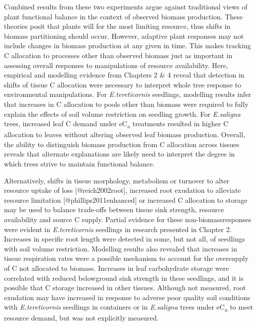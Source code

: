\documentclass[a4paper]{article}
\begin{document}
Combined results from these two experiments argue against traditional views of plant functional balance in the context of observed biomass production. These theories posit that plants will  for the most limiting resource, thus shifts in biomass partitioning should occur. However, adaptive plant responses may not include changes in biomass production at any given  in time.  This makes tracking C allocation to processes other than observed biomass just as important in assessing overall responses to manipulations of resource availability. Here, empirical and modelling evidence from Chapters 2 \& 4 reveal that detection in shifts of tissue C allocation were necessary to interpret whole tree response to environmental manipulations. For \textit{E.tereticornis} seedlings, modelling results infer that increases in C allocation to pools other than biomass were required to fully explain the effects of soil volume restriction on seedling growth. For \textit{E.saligna} trees, increased leaf C demand under eC\textsubscript{a} treatments resulted in higher C allocation to leaves without altering observed leaf biomass production. Overall, the ability to distinguish biomass production from C allocation across tissues reveals that alternate explanations are likely need to interpret the degree in which trees strive to maintain functional balance.

Alternatively, shifts in tissue morphology, metabolism or turnover to alter resource uptake of loss [@reich2002root], increased root exudation to alleviate resource limitation [@phillips2011enhanced] or increased C allocation to storage \citep{sala2012carbon, dietze2014nonstructural} may be used to balance trade-offs between tissue sink strength, resource availability and source C supply. Partial evidence for these \textquotesingle non-biomass\textquotesingle responses were evident in \textit{E.tereticornis} seedlings in research presented in Chapter 2. Increases in specific root length were detected in some, but not all, of seedlings with soil volume restriction. Modelling results also revealed that increases in tissue respiration rates were a possible mechanism to account for the oversupply of C not allocated to biomass. Increases in leaf carbohydrate storage were correlated with reduced belowground sink strength in these seedlings, and it is possible that C storage increased in other tissues. Although not measured, root exudation may have increased in response to adverse poor quality soil conditions with \textit{E.tereticornis} seedlings in containers or in \textit{E.saligna} trees under eC\textsubscript{a} to meet resource demand, but was not explicitly measured.
\end{document}
